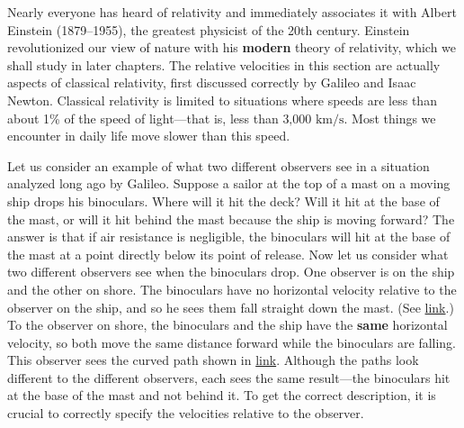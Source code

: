 \documentclass[
]{book}
\begin{document}
Nearly everyone has heard of relativity and immediately associates it
with Albert Einstein (1879--1955), the greatest physicist of the 20th
century. Einstein revolutionized our view of nature with his \textbf{modern}
theory of relativity, which we shall study in later chapters. The
relative velocities in this section are actually aspects of classical
relativity, first discussed correctly by Galileo and Isaac Newton.
\protect\hypertarget{import-auto-id1447237}{}{Classical relativity} is
limited to situations where speeds are less than about 1\% of the speed
of light---that is, less than \(\text{3,000~km/s}{}\). Most things we
encounter in daily life move slower than this speed.

Let us consider an example of what two different observers see in a
situation analyzed long ago by Galileo. Suppose a sailor at the top of a
mast on a moving ship drops his binoculars. Where will it hit the deck?
Will it hit at the base of the mast, or will it hit behind the mast
because the ship is moving forward? The answer is that if air resistance
is negligible, the binoculars will hit at the base of the mast at a
point directly below its point of release. Now let us consider what two
different observers see when the binoculars drop. One observer is on the
ship and the other on shore. The binoculars have no horizontal velocity
relative to the observer on the ship, and so he sees them fall straight
down the mast. (See
\protect\hyperlink{import-auto-id1892076}{link}.) To the observer
on shore, the binoculars and the ship have the \textbf{same} horizontal
velocity, so both move the same distance forward while the binoculars
are falling. This observer sees the curved path shown in
\protect\hyperlink{import-auto-id1892076}{link}. Although the
paths look different to the different observers, each sees the same
result---the binoculars hit at the base of the mast and not behind it.
To get the correct description, it is crucial to correctly specify the
velocities relative to the observer.
\end{document}
